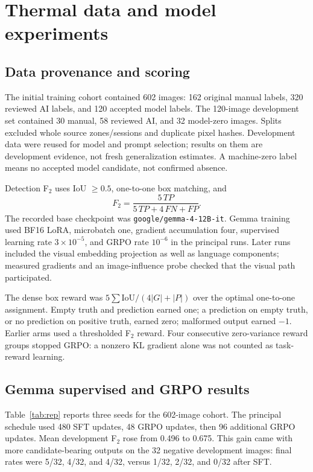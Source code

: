 \documentclass[10pt,a4paper,twocolumn]{article}
\begin{document}
\section{Thermal data and model experiments}
\subsection{Data provenance and scoring}
The initial training cohort contained 602 images: 162 original manual labels, 320 reviewed AI labels, and 120 accepted model labels. The 120-image development set contained 30 manual, 58 reviewed AI, and 32 model-zero images. Splits excluded whole source zones/sessions and duplicate pixel hashes. Development data were reused for model and prompt selection; results on them are development evidence, not fresh generalization estimates. A machine-zero label means no accepted model candidate, not confirmed absence.

Detection F$_2$ uses IoU $\geq0.5$, one-to-one box matching, and
\[
F_2=\frac{5\,TP}{5\,TP+4\,FN+FP}.
\]
The recorded base checkpoint was \texttt{google/gemma-4-12B-it}. Gemma training used BF16 LoRA, microbatch one, gradient accumulation four, supervised learning rate $3\times10^{-5}$, and GRPO rate $10^{-6}$ in the principal runs. Later runs included the visual embedding projection as well as language components; measured gradients and an image-influence probe checked that the visual path participated.

The dense box reward was $5\sum\mathrm{IoU}/(4|G|+|P|)$ over the optimal one-to-one assignment. Empty truth and prediction earned one; a prediction on empty truth, or no prediction on positive truth, earned zero; malformed output earned $-1$. Earlier arms used a thresholded F$_2$ reward. Four consecutive zero-variance reward groups stopped GRPO: a nonzero KL gradient alone was not counted as task-reward learning.

\subsection{Gemma supervised and GRPO results}
Table~\ref{tab:rep} reports three seeds for the 602-image cohort. The principal schedule used 480 SFT updates, 48 GRPO updates, then 96 additional GRPO updates. Mean development F$_2$ rose from 0.496 to 0.675. This gain came with more candidate-bearing outputs on the 32 negative development images: final rates were 5/32, 4/32, and 4/32, versus 1/32, 2/32, and 0/32 after SFT.

\begin{table}[ht]\centering\small\caption{602-image cohort: development F$_2$ across three seeds.}\label{tab:rep}\end{table}
\end{document}
